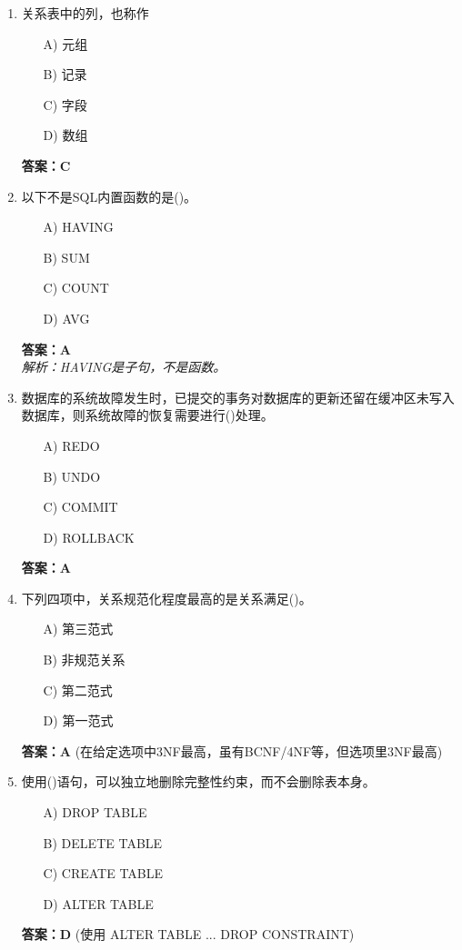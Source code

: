 \documentclass[a4paper,12pt]{article}
\begin{document}
\begin{enumerate}[label=\arabic*.]
\item 关系表中的列，也称作
\begin{itemize}
    \item[A)] 元组
    \item[B)] 记录
    \item[C)] 字段
    \item[D)] 数组
\end{itemize}
\textbf{答案：C}

\item 以下不是SQL内置函数的是()。
\begin{itemize}
    \item[A)] HAVING
    \item[B)] SUM
    \item[C)] COUNT
    \item[D)] AVG
\end{itemize}
\textbf{答案：A} \\
\textit{解析：HAVING是子句，不是函数。}

\item 数据库的系统故障发生时，已提交的事务对数据库的更新还留在缓冲区未写入数据库，则系统故障的恢复需要进行()处理。
\begin{itemize}
    \item[A)] REDO
    \item[B)] UNDO
    \item[C)] COMMIT
    \item[D)] ROLLBACK
\end{itemize}
\textbf{答案：A}

\item 下列四项中，关系规范化程度最高的是关系满足()。
\begin{itemize}
    \item[A)] 第三范式
    \item[B)] 非规范关系
    \item[C)] 第二范式
    \item[D)] 第一范式
\end{itemize}
\textbf{答案：A} (在给定选项中3NF最高，虽有BCNF/4NF等，但选项里3NF最高)

\item 使用()语句，可以独立地删除完整性约束，而不会删除表本身。
\begin{itemize}
    \item[A)] DROP TABLE
    \item[B)] DELETE TABLE
    \item[C)] CREATE TABLE
    \item[D)] ALTER TABLE
\end{itemize}
\textbf{答案：D} (使用 ALTER TABLE ... DROP CONSTRAINT)


\end{enumerate}
\end{document}
